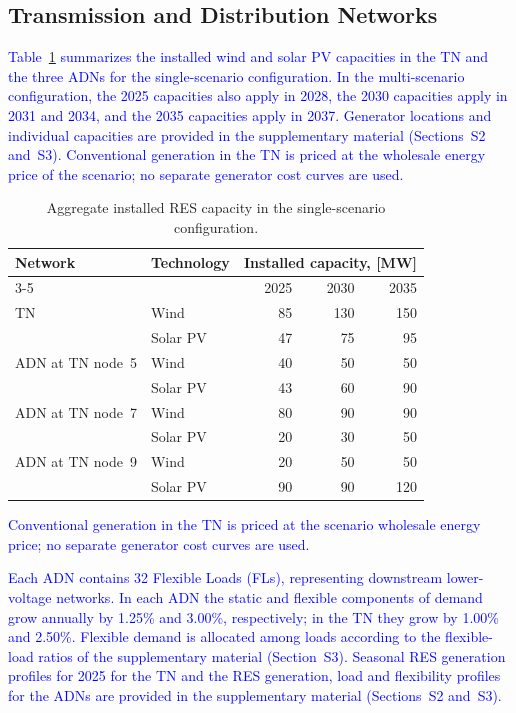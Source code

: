 \documentclass[preprint,12pt]{elsarticle}
\begin{document}
\subsection{Transmission and Distribution Networks}
\label{subsec:case_study_adns}

\textcolor{blue}{
    Table~\ref{tab:res_capacity_summary} summarizes the installed wind and solar PV capacities in the TN and the three ADNs for the single-scenario configuration. In the multi-scenario configuration, the 2025 capacities also apply in 2028, the 2030 capacities apply in 2031 and 2034, and the 2035 capacities apply in 2037. 
    Generator locations and individual capacities are provided in the supplementary material (Sections~S2 and~S3).
    Conventional generation in the TN is priced at the wholesale energy price of the scenario; no separate generator cost curves are used.
}

\begin{table}[htbp!]
    \centering
    \caption{Aggregate installed RES capacity in the
    single-scenario configuration.}
    \label{tab:res_capacity_summary}
    \begin{tabular}{@{}llrrr@{}}
        \toprule
        Network & Technology & \multicolumn{3}{c}{Installed capacity, [MW]} \\
        \cmidrule(lr){3-5}
        & & 2025 & 2030 & 2035 \\
        \midrule
        TN & Wind     & 85 & 130 & 150 \\
           & Solar PV & 47 & 75  & 95  \\
        \midrule
        ADN at TN node~5 & Wind     & 40 & 50 & 50 \\
                         & Solar PV & 43 & 60 & 90 \\
        \midrule
        ADN at TN node~7 & Wind     & 80 & 90 & 90 \\
                         & Solar PV & 20 & 30 & 50 \\
        \midrule
        ADN at TN node~9 & Wind     & 20 & 50 & 50  \\
                         & Solar PV & 90 & 90 & 120 \\
        \bottomrule
    \end{tabular}
\end{table}

\textcolor{blue}{
    Conventional generation in the TN is priced at the scenario wholesale energy price; no separate generator cost curves are used.
}

\textcolor{blue}{
    Each ADN contains 32 Flexible Loads (FLs), representing downstream lower-voltage networks. In each ADN the static and flexible components of demand grow annually by 1.25\% and 3.00\%, respectively; in the TN they grow by 1.00\% and 2.50\%. Flexible demand is allocated among loads according to the flexible-load ratios of the supplementary material (Section~S3).
    Seasonal RES generation profiles for 2025 for the TN and the RES generation, load and flexibility profiles for the ADNs are provided in the supplementary material (Sections~S2 and~S3).
}
\end{document}
